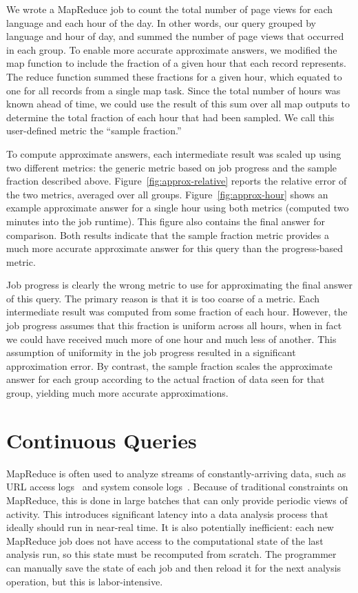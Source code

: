 We wrote a MapReduce job to count the total number of page views for each
language and each hour of the day. In other words, our query grouped by language
and hour of day, and summed the number of page views that occurred in each
group. To enable more accurate approximate answers, we modified the map function
to include the fraction of a given hour that each record represents. The reduce
function summed these fractions for a given hour, which equated to one for all
records from a single map task. Since the total number of hours was known ahead
of time, we could use the result of this sum over all map outputs to determine
the total fraction of each hour that had been sampled. We call this user-defined
metric the ``sample fraction.''

To compute approximate answers, each intermediate result was scaled up using two
different metrics: the generic metric based on job progress and the sample
fraction described above. Figure~\ref{fig:approx-relative} reports the relative
error of the two metrics, averaged over all groups. Figure~\ref{fig:approx-hour}
shows an example approximate answer for a single hour using both metrics
(computed two minutes into the job runtime). This figure also contains the final
answer for comparison. Both results indicate that the sample fraction metric provides a
much more accurate approximate answer for this query than the progress-based
metric.

Job progress is clearly the wrong metric to use for approximating the final
answer of this query. The primary reason is that it is too coarse of a
metric. Each intermediate result was computed from some fraction of each
hour. However, the job progress assumes that this fraction is uniform across all
hours, when in fact we could have received much more of one hour and much less
of another. This assumption of uniformity in the job progress resulted in a
significant approximation error. By contrast, the sample fraction scales the
approximate answer for each group according to the actual fraction of data seen for
that group, yielding much more accurate approximations.

\section{Continuous Queries}
\label{ch:hop:sec:continuous}

MapReduce is often used to analyze streams of constantly-arriving
data, such as URL access logs~\cite{mapreduce-osdi} and system console
logs~\cite{sosp-mining}. Because of traditional constraints on MapReduce, this 
is done in large batches that can only provide periodic views of activity.
This introduces
significant latency into a data analysis process that ideally should run in 
near-real time. It is also
potentially inefficient: each new MapReduce job does not have access
to the computational state of the last analysis run, so this state
must be recomputed from scratch. The programmer can manually save the
state of each job and then reload it for the next analysis operation,
but this is labor-intensive.

